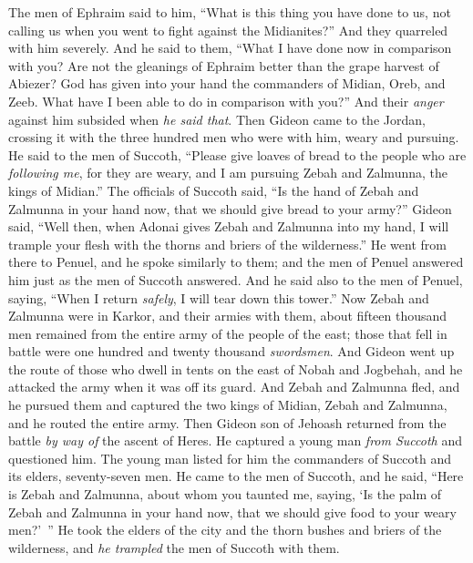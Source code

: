 \begin{biblechapter} %
 The men of Ephraim said to him, “What is this thing you have done to us, not calling us when you went to fight against the Midianites?” And they quarreled with him severely.
\verse And he said to them, “What I have done now in comparison with you? Are not the gleanings of Ephraim better than the grape harvest of Abiezer?
\verse God has given into your hand the commanders of Midian, Oreb, and Zeeb. What have I been able to do in comparison with you?” And their \textit{anger} against him subsided when \textit{he said that}.
\verse Then Gideon came to the Jordan, crossing it with the three hundred men who were with him, weary and pursuing.
\verse He said to the men of Succoth, “Please give loaves of bread to the people who are \textit{following me}, for they are weary, and I am pursuing Zebah and Zalmunna, the kings of Midian.”
\verse The officials of Succoth said, “Is the hand of Zebah and Zalmunna in your hand now, that we should give bread to your army?”
\verse Gideon said, “Well then, when Adonai gives Zebah and Zalmunna into my hand, I will trample your flesh with the thorns and briers of the wilderness.”
\verse He went from there to Penuel, and he spoke similarly to them; and the men of Penuel answered him just as the men of Succoth answered.
\verse And he said also to the men of Penuel, saying, “When I return \textit{safely}, I will tear down this tower.”
\verse Now Zebah and Zalmunna were in Karkor, and their armies with them, about fifteen thousand men remained from the entire army of the people of the east; those that fell in battle were one hundred and twenty thousand \textit{swordsmen}.
\verse And Gideon went up the route of those who dwell in tents on the east of Nobah and Jogbehah, and he attacked the army when it was off its guard.
\verse And Zebah and Zalmunna fled, and he pursued them and captured the two kings of Midian, Zebah and Zalmunna, and he routed the entire army.
\verse Then Gideon son of Jehoash returned from the battle \textit{by way of} the ascent of Heres.
\verse He captured a young man \textit{from Succoth} and questioned him. The young man listed for him the commanders of Succoth and its elders, seventy-seven men.
\verse He came to the men of Succoth, and he said, “Here is Zebah and Zalmunna, about whom you taunted me, saying, ‘Is the palm of Zebah and Zalmunna in your hand now, that we should give food to your weary men?’ ”
\verse He took the elders of the city and the thorn bushes and briers of the wilderness, and \textit{he trampled} the men of Succoth with them.

\end{biblechapter}
